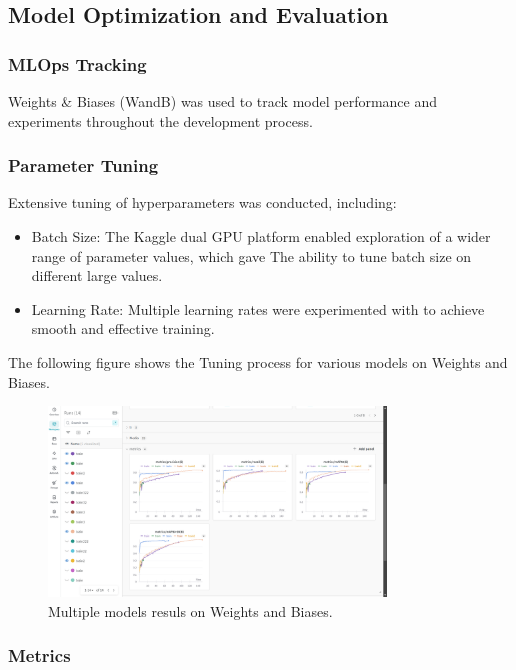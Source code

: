 \documentclass{article}
\begin{document}
\subsection{Model Optimization and Evaluation}

\subsubsection{MLOps Tracking}

Weights \& Biases (WandB) was used to track model performance and experiments throughout the development process.\\

\subsubsection{Parameter Tuning}

Extensive tuning of hyperparameters was conducted, including:

\begin{itemize}
\item Batch Size: The Kaggle dual GPU platform enabled exploration of a wider range of parameter values, which gave The ability to tune batch size on different large values.
\item Learning Rate: Multiple learning rates were experimented with to achieve smooth and effective training.
\end{itemize}

The following figure shows the Tuning process for various models on Weights and Biases.
\begin{figure}[htb]
    \centering
    \includegraphics[width=0.8\textwidth]{wandb.png}
    \caption{Multiple models resuls on Weights and Biases.}
    \label{fig:wandb}
\end{figure}

\subsubsection{Metrics}
\end{document}
